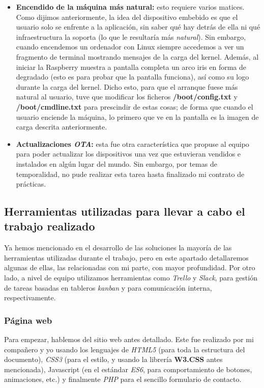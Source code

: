 \documentclass[13pt]{scrartcl}
\begin{document}
\begin{itemize}
					\item \textbf{Encendido de la máquina más natural:} esto requiere varios matices. Como dijimos anteriormente, la idea del dispositivo embebido es que el usuario solo se enfrente a la aplicación, sin saber qué hay detrás de ella ni qué infraestructura la soporta (lo que le resultaría más \textit{natural}). Sin embargo, cuando encendemos un ordenador con Linux siempre accedemos a ver un fragmento de terminal mostrando mensajes de la carga del kernel. Además, al iniciar la Raspberry muestra a pantalla completa un arco iris en forma de degradado (esto es para probar que la pantalla funciona), así como su logo durante la carga del kernel. Dicho esto, para que el arranque fuese más natural al usuario, tuve que modificar los ficheros \textbf{/boot/config.txt} y \textbf{/boot/cmdline.txt} para prescindir de estas cosas; de forma que cuando el usuario enciende la máquina, lo primero que ve en la pantalla es la imagen de carga descrita anteriormente.
					\item \textbf{Actualizaciones \textit{OTA}:} esta fue otra característica que propuse al equipo para poder actualizar los dispositivos una vez que estuvieran vendidos e instalados en algún lugar del mundo. Sin embargo, por temas de temporalidad, no pude realizar esta tarea hasta finalizado mi contrato de prácticas.
				\end{itemize}
			
		\subsection{Herramientas utilizadas para llevar a cabo el trabajo realizado}
			Ya hemos mencionado en el desarrollo de las soluciones la mayoría de las herramientas utilizadas durante el trabajo, pero en este apartado detallaremos algunas de ellas, las relacionadas con mi parte, con mayor profundidad. Por otro lado, a nivel de equipo utilizamos herramientas como \textit{Trello} y \textit{Slack}, para gestión de tareas basadas en tableros \textit{kanban} y para comunicación interna, respectivamente.
			
			\subsubsection{Página web}
				Para empezar, hablemos del sitio web antes detallado. Este fue realizado por mi compañero y yo usando los lenguajes de \textit{HTML5} (para toda la estructura del documento), \textit{CSS3} (para el estilo, y usando la librería \textbf{W3.CSS} antes mencionada), Javascript (en el estándar \textit{ES6}, para comportamiento de botones, animaciones, etc.) y finalmente \textit{PHP} para el sencillo formulario de contacto.
				
\end{document}
